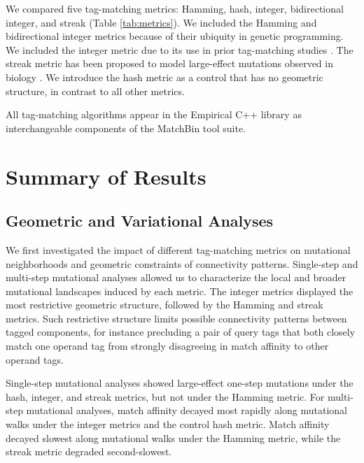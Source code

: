 

We compared five tag-matching metrics: Hamming, hash, integer, bidirectional integer, and streak (Table \ref{tab:metrics}).
We included the Hamming and bidirectional integer metrics because of their ubiquity in genetic programming.
We included the integer metric due to its use in prior tag-matching studies \citep{spector2011tag,spector2012tag}.
The streak metric has been proposed to model large-effect mutations observed in biology \cite{downing2015intelligence}.
We introduce the hash metric as a control that has no geometric structure, in contrast to all other metrics.

All tag-matching algorithms appear in the Empirical C++ library \citep{charles_ofria_2019_2575607} as interchangeable components of the MatchBin tool suite.

\section{Summary of Results}


\subsection{Geometric and Variational Analyses}

We first investigated the impact of different tag-matching metrics on mutational neighborhoods and geometric constraints of connectivity patterns.
Single-step and multi-step mutational analyses allowed us to characterize the local and broader mutational landscapes induced by each metric.
The integer metrics displayed the most restrictive geometric structure, followed by the Hamming and streak metrics.
Such restrictive structure limits possible connectivity patterns between tagged components, for instance precluding a pair of query tags that both closely match one operand tag from strongly disagreeing in match affinity to other operand tags.

Single-step mutational analyses showed large-effect one-step mutations under the hash, integer, and streak metrics, but not under the Hamming metric.
For multi-step mutational analyses, match affinity decayed most rapidly along mutational walks under the integer metrics and the control hash metric.
Match affinity decayed slowest along mutational walks under the Hamming metric, while the streak metric degraded second-slowest.

